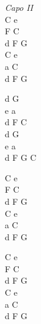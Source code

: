 \begin{chord}
    \textit{Capo II}\\
    C e\\
    F C\\
    d F G\\
    C e\\
    a C\\
    d F G

    d G\\
    e a\\
    d F C\\
    d G\\
    e a\\
    d F G C

    C e\\
    F C\\
    d F G\\
    C e\\
    a C\\
    d F G

    C e\\
    F C\\
    d F G\\
    C e\\
    a C\\
    d F G
\end{chord}